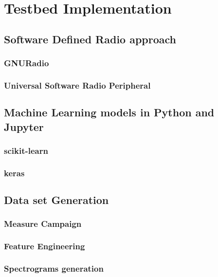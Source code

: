 \acresetall
\chapter{Testbed Implementation}\label{chapter:implementation}

\section{Software Defined Radio approach}
\subsection{GNURadio}
\subsection{Universal Software Radio Peripheral}
\section{Machine Learning models in Python and Jupyter}
\subsection{scikit-learn}
\subsection{keras}


\section{Data set Generation}
\subsection{Measure Campaign}
\subsection{Feature Engineering}
\subsection{Spectrograms generation}